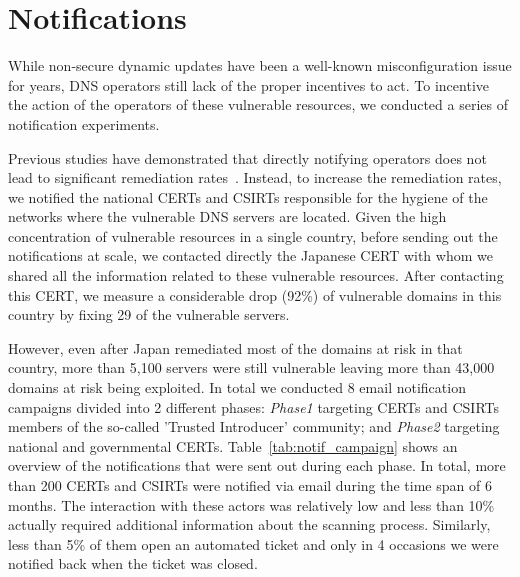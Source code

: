 \section{Notifications}

While non-secure dynamic updates have been a well-known misconfiguration issue for years, DNS operators still lack of the proper incentives to act.
To incentive the action of the operators of these vulnerable resources, we conducted a series of notification experiments.

Previous studies have demonstrated that directly notifying  operators does not lead to significant remediation rates~\cite{cetin2017make}. Instead, to increase the remediation rates, we notified the national CERTs and CSIRTs responsible for the hygiene of the networks where the vulnerable DNS servers are located.
Given the high concentration of vulnerable resources in a single country, before sending out the notifications at scale, we contacted directly the Japanese CERT with whom we shared all the information related to these vulnerable resources. After contacting this CERT, we measure a considerable drop (92\%) of vulnerable domains in this country by fixing 29 of the vulnerable servers.


However, even after Japan remediated most of the domains at risk in that country, more than 5,100 servers were still vulnerable leaving more than 43,000 domains at risk being exploited.
In total we conducted 8 email notification campaigns divided into 2 different phases: \textit{Phase1} targeting CERTs and CSIRTs members of the so-called 'Trusted Introducer' community; and  \textit{Phase2} targeting national and governmental CERTs. Table~\ref{tab:notif_campaign} shows an overview of the notifications that were sent out during each phase. In total, more than 200 CERTs and CSIRTs were notified via email during the time span of 6 months. The interaction with these actors was relatively low and less than 10\% actually required additional information about the scanning process. Similarly, less than 5\% of them open an automated ticket and only in 4 occasions we were notified back when the ticket was closed.

